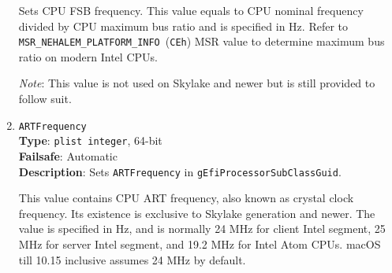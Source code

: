 \documentclass[]{article}
\begin{document}
\begin{enumerate}
  Sets CPU FSB frequency. This value equals to CPU nominal frequency divided
  by CPU maximum bus ratio and is specified in Hz. Refer to
  \texttt{MSR\_NEHALEM\_PLATFORM\_INFO}~(\texttt{CEh}) MSR value to determine
  maximum bus ratio on modern Intel CPUs.

  \emph{Note}: This value is not used on Skylake and newer but is still provided
  to follow suit.
\item
  \texttt{ARTFrequency}\\
  \textbf{Type}: \texttt{plist\ integer}, 64-bit\\
  \textbf{Failsafe}: Automatic\\
  \textbf{Description}: Sets \texttt{ARTFrequency} in
  \texttt{gEfiProcessorSubClassGuid}.

  This value contains CPU ART frequency, also known as crystal clock frequency.
  Its existence is exclusive to Skylake generation and newer. The value is specified
  in Hz, and is normally 24 MHz for client Intel segment, 25 MHz for server Intel segment,
  and 19.2 MHz for Intel Atom CPUs. macOS till 10.15 inclusive assumes 24 MHz by default.


\end{enumerate}
\end{document}
